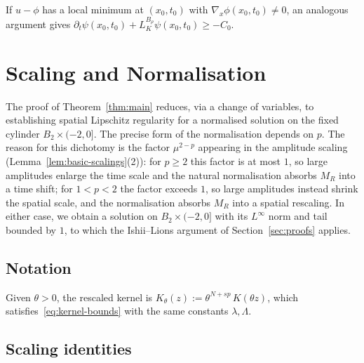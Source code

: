 \documentclass[11pt, a4paper, twoside]{article}
\theoremstyle{definition}
\theoremstyle{remark}
\begin{document}

\begin{remark}\label{rem:weak-to-visc-local-min}
If $u - \phi$ has a local minimum at $(x_0,t_0)$ with
$\nabla_x\phi(x_0,t_0) \neq 0$, an analogous argument
gives
$\partial_t\psi(x_0,t_0)
+ L_K^{B_\rho}\psi(x_0,t_0) \ge -C_0$.
\end{remark}




\section{Scaling and Normalisation}
\label{sec:scaling-reduction}

The proof of Theorem~\ref{thm:main} reduces, via a change
of variables, to establishing spatial Lipschitz regularity
for a normalised solution on the fixed cylinder
$B_2 \times (-2,0]$. The precise form of the normalisation
depends on $p$. The reason for
this dichotomy is the factor $\mu^{2-p}$ appearing in the amplitude scaling
(Lemma~\ref{lem:basic-scalings}(2)): for $p \ge 2$ this factor is at most $1$, so large
amplitudes enlarge the time scale and the natural normalisation absorbs $M_R$ into a time
shift; for $1 < p < 2$ the factor exceeds $1$, so large amplitudes instead shrink the
spatial scale, and the normalisation absorbs $M_R$ into a spatial rescaling. In either case, we 
obtain a solution on $B_2 \times (-2,0]$ with its $L^\infty$ norm and tail bounded by
$1$, to which the Ishii--Lions argument of Section~\ref{sec:proofs} applies.

\subsection*{Notation}

Given $\theta > 0$, the rescaled kernel is
$K_\theta(z) := \theta^{N+sp}\, K(\theta z)$,
which satisfies~\eqref{eq:kernel-bounds} with the same
constants $\lambda, \Lambda$.

\subsection*{Scaling identities}
\end{document}
